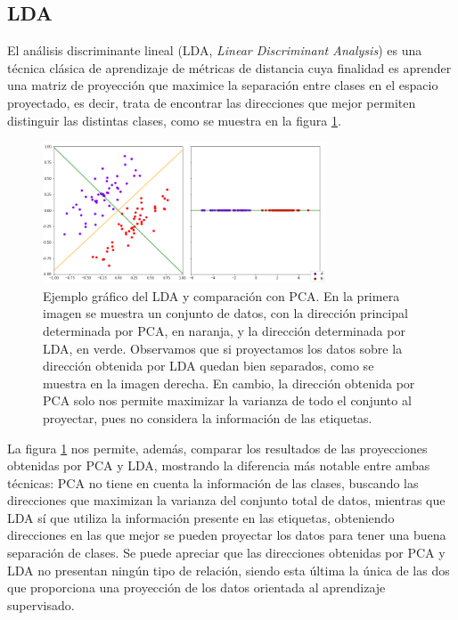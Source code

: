 
\subsection{LDA}

El análisis discriminante lineal (LDA, \emph{Linear Discriminant Analysis}) es una técnica clásica de aprendizaje de métricas de distancia cuya finalidad es aprender una matriz de proyección que maximice la separación entre clases en el espacio proyectado, es decir, trata de encontrar las direcciones que mejor permiten distinguir las distintas clases, como se muestra en la figura \ref{fig:lda}.

\begin{figure}[h]
    \centering
    \includegraphics[width=0.75\textwidth]{./images/lda.png}
    \caption{Ejemplo gráfico del LDA y comparación con PCA. En la primera imagen se muestra un conjunto de datos, con la dirección principal determinada por PCA, en naranja, y la dirección determinada por LDA, en verde. Observamos que si proyectamos los datos sobre la dirección obtenida por LDA quedan bien separados, como se muestra en la imagen derecha. En cambio, la dirección obtenida por PCA solo nos permite maximizar la varianza de todo el conjunto al proyectar, pues no considera la información de las etiquetas.} \label{fig:lda}
\end{figure}


La figura \ref{fig:lda} nos permite, además, comparar los resultados de las proyecciones obtenidas por PCA y LDA, mostrando la diferencia más notable entre ambas técnicas: PCA no tiene en cuenta la información de las clases, buscando las direcciones que maximizan la varianza del conjunto total de datos, mientras que LDA sí que utiliza la información presente en las etiquetas, obteniendo direcciones en las que mejor se pueden proyectar los datos para tener una buena separación de clases. Se puede apreciar que las direcciones obtenidas por PCA y LDA no presentan ningún tipo de relación, siendo esta última la única de las dos que proporciona una proyección de los datos orientada al aprendizaje supervisado. 

